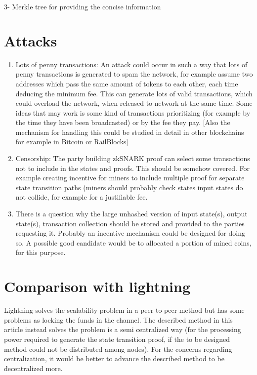 \documentclass{article}
\begin{document}
3- Merkle tree for providing the concise information

\section{Attacks}

\begin{enumerate}
\item Lots of penny transactions: An attack could occur in such a way that lots of penny transactions is generated to spam the network, for example assume two addresses which pass the same amount of tokens to each other, each time deducing the minimum fee. This can generate lots of valid transactions, which could overload the network, when released to network at the same time. Some ideas that may work is some kind of transactions prioritizing (for example by the time they have been broadcasted) or by the fee they pay. [Also the mechanism for handling this could be studied in detail in other blockchains for example in Bitcoin or RailBlocks]

\item Censorship: The party building zkSNARK proof can select some transactions not to include in the states and proofs. This should be somehow covered.  For example creating incentive for miners to include multiple proof for separate state transition paths (miners should probably check states input states do not collide, for example for a justifiable fee.

\item There is a question why the large unhashed version of input state(s), output state(s), transaction collection should be stored and provided to the parties requesting it. Probably an incentive mechanism could be designed for doing so. A possible good candidate would be to allocated a portion of mined coins, for this purpose.

\end{enumerate}

\section{Comparison with lightning}

Lightning solves the scalability problem in a peer-to-peer method but has some problems as locking the funds in the channel. The described method in this article instead solves the problem is a semi centralized way (for the processing power required to generate the state transition proof, if the to be designed method could not be distributed among nodes). For the concerns regarding centralization, it would be better to advance the described method to be decentralized more.
\end{document}
